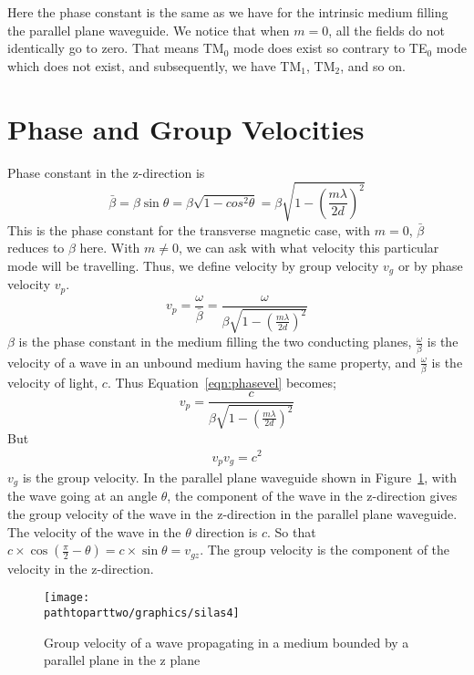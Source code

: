Here the phase constant is the same as we have for the intrinsic medium filling the parallel plane waveguide. We notice that when $m = 0$, all the fields do not identically go to zero. That means TM$_0$ mode does exist so contrary to TE$_0$ mode which does not exist, and subsequently, we have TM$_{1}$, TM$_{2}$, and so on. 

\section{Phase and Group Velocities}
Phase constant in the z-direction is
\begin{dmath*}
\bar{\beta} = \beta\sin\theta = \beta \sqrt{1- cos^{2}\theta} =\beta\sqrt{1 - \left(\frac{m\lambda}{2d}\right)^{2}}
\end{dmath*}
This is the phase constant for the transverse magnetic case, with $m = 0$, $\bar{\beta}$ reduces to $\beta$ here. With $m\neq 0$, we can ask with what velocity this particular mode will be travelling. Thus, we define velocity by group velocity $v_{g}$ or by phase velocity $v_{p}$. 
\begin{dmath}
 v_{p}=\frac{\omega}{\bar{\beta}} =\frac{\omega}{\beta \sqrt{1 - \left(\frac{m\lambda}{2d}\right)^{2}}}
\label{eqn:phasevel}
\end{dmath}
$\beta$ is the phase constant in the medium filling the two conducting planes, $\frac{\omega}{\beta}$ is the velocity of a wave in an unbound medium having the same property, and $\frac{\omega}{\beta}$ is the velocity of light, $c$. Thus Equation~\ref{eqn:phasevel} becomes;
\begin{equation*}
v_{p} =\frac{c}{\beta\sqrt{1 - \left(\frac{m\lambda}{2d}\right)^{2}}}
\end{equation*}
But 
\begin{align}
v_{p} v_{g}= c^{2}
\label{eqn:grpvel}
\end{align}
$v_{g}$ is the group velocity. In the parallel plane waveguide shown in Figure~\ref{fig:silas4}, with the wave going at an angle $\theta$, the component of the wave in the z-direction gives the group velocity of the wave in the z-direction in the parallel plane waveguide. The velocity of the wave in the $\theta$ direction is $c$. So that $c\times \cos(\frac{\pi}{2} - \theta)= c\times \sin\theta= v_{gz}$. The group velocity is the component of the velocity in the z-direction.
\begin{figure}[h]
\centering
\texttt{[image: \\pathtoparttwo/graphics/silas4]}
\caption{Group velocity of a wave propagating in a medium bounded by a parallel plane in the z plane}
\label{fig:silas4}
\end{figure}
